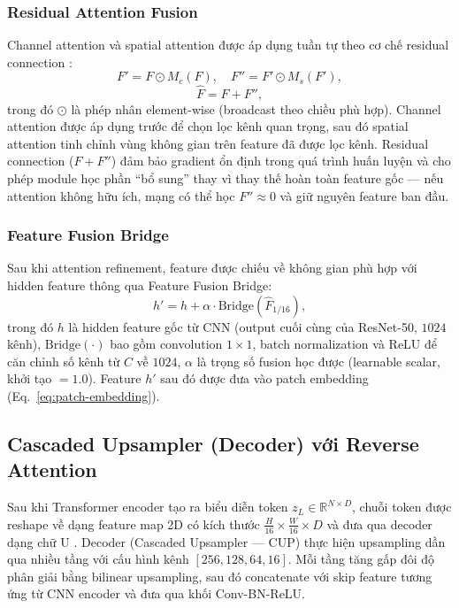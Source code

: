\documentclass[10pt,a4paper]{article}
\begin{document}
\subsubsection{Residual Attention Fusion}

Channel attention và spatial attention được áp dụng tuần tự theo cơ chế residual connection \cite{he2016resnet}:
\begin{equation}
    F' = F \odot M_c(F), \quad F'' = F' \odot M_s(F'),
    \label{eq:sequential-attention}
\end{equation}
\begin{equation}
    \hat{F} = F + F'',
    \label{eq:residual-attention}
\end{equation}
trong đó $\odot$ là phép nhân element-wise (broadcast theo chiều phù hợp). Channel attention được áp dụng trước để chọn lọc kênh quan trọng, sau đó spatial attention tinh chỉnh vùng không gian trên feature đã được lọc kênh. Residual connection ($F + F''$) đảm bảo gradient ổn định trong quá trình huấn luyện và cho phép module học phần ``bổ sung'' thay vì thay thế hoàn toàn feature gốc --- nếu attention không hữu ích, mạng có thể học $F'' \approx 0$ và giữ nguyên feature ban đầu.

\subsubsection{Feature Fusion Bridge}

Sau khi attention refinement, feature được chiếu về không gian phù hợp với hidden feature thông qua Feature Fusion Bridge:
\begin{equation}
    h' = h + \alpha \cdot \text{Bridge}(\hat{F}_{1/16}),
    \label{eq:fusion-bridge}
\end{equation}
trong đó $h$ là hidden feature gốc từ CNN (output cuối cùng của ResNet-50, $1024$ kênh), $\text{Bridge}(\cdot)$ bao gồm convolution $1\times1$, batch normalization và ReLU để căn chỉnh số kênh từ $C$ về $1024$, $\alpha$ là trọng số fusion học được (learnable scalar, khởi tạo $= 1.0$). Feature $h'$ sau đó được đưa vào patch embedding (Eq.~\ref{eq:patch-embedding}).

\subsection{Cascaded Upsampler (Decoder) với Reverse Attention}

Sau khi Transformer encoder tạo ra biểu diễn token $z_L \in \mathbb{R}^{N \times D}$, chuỗi token được reshape về dạng feature map 2D có kích thước $\frac{H}{16} \times \frac{W}{16} \times D$ và đưa qua decoder dạng chữ U \cite{chen2021transunet}. Decoder (Cascaded Upsampler --- CUP) thực hiện upsampling dần qua nhiều tầng với cấu hình kênh $[256, 128, 64, 16]$. Mỗi tầng tăng gấp đôi độ phân giải bằng bilinear upsampling, sau đó concatenate với skip feature tương ứng từ CNN encoder và đưa qua khối Conv-BN-ReLU.
\end{document}

